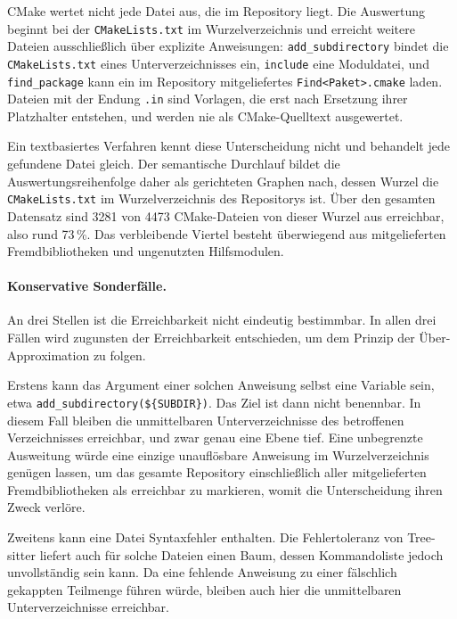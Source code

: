 \documentclass[12pt,a4paper,twoside,headsepline,parskip=half]{scrreprt}
\begin{document}
CMake wertet nicht jede Datei aus, die im Repository liegt. Die Auswertung beginnt bei
der \texttt{CMakeLists.txt} im Wurzelverzeichnis und erreicht weitere Dateien
ausschließlich über explizite Anweisungen: \texttt{add\_subdirectory} bindet die
\texttt{CMakeLists.txt} eines Unterverzeichnisses ein, \texttt{include} eine
Moduldatei, und \texttt{find\_package} kann ein im Repository mitgeliefertes
\texttt{Find<Paket>.cmake} laden. Dateien mit der Endung \texttt{.in} sind Vorlagen,
die erst nach Ersetzung ihrer Platzhalter entstehen, und werden nie als CMake-Quelltext
ausgewertet.

Ein textbasiertes Verfahren kennt diese Unterscheidung nicht und behandelt jede
gefundene Datei gleich. Der semantische Durchlauf bildet die Auswertungsreihenfolge
daher als gerichteten Graphen nach, dessen Wurzel die
\texttt{CMakeLists.txt} im Wurzelverzeichnis des Repositorys ist. Über den gesamten
Datensatz sind 3281 von 4473 CMake-Dateien von dieser Wurzel aus erreichbar, also
rund 73\,\%. Das verbleibende Viertel besteht überwiegend aus mitgelieferten
Fremdbibliotheken und ungenutzten Hilfsmodulen.

\paragraph{Konservative Sonderfälle.}
An drei Stellen ist die Erreichbarkeit nicht eindeutig bestimmbar. In allen drei
Fällen wird zugunsten der Erreichbarkeit entschieden, um dem Prinzip der
Über-Approximation zu folgen.

Erstens kann das Argument einer solchen Anweisung selbst eine Variable sein, etwa
\texttt{add\_subdirectory(\$\{SUBDIR\})}. Das Ziel ist dann nicht benennbar. In diesem
Fall bleiben die unmittelbaren Unterverzeichnisse des betroffenen Verzeichnisses
erreichbar, und zwar genau eine Ebene tief. Eine unbegrenzte Ausweitung würde eine
einzige unauflösbare Anweisung im Wurzelverzeichnis genügen lassen, um das gesamte
Repository einschließlich aller mitgelieferten Fremdbibliotheken als erreichbar zu
markieren, womit die Unterscheidung ihren Zweck verlöre.

Zweitens kann eine Datei Syntaxfehler enthalten. Die Fehlertoleranz von Tree-sitter
liefert auch für solche Dateien einen Baum, dessen Kommandoliste jedoch unvollständig
sein kann. Da eine fehlende Anweisung zu einer fälschlich gekappten Teilmenge führen
würde, bleiben auch hier die unmittelbaren Unterverzeichnisse erreichbar.
\end{document}
